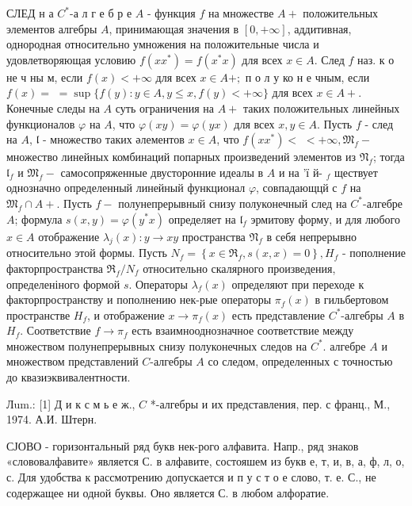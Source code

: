 \documentclass[10pt]{article}
\begin{document}
СЛЕД н а $C^{*}$-а л г е б р е $A$ - функция $f$ на множестве $A+$ положительных элементов алгебры $A$, принимающая значения в $[0,+\infty]$, аддитивная, однородная относительно умножения на положительные числа и удовлетворяющая условию $f\left(x x^{*}\right)=f\left(x^{*} x\right)$ для всех $x \in A$. След $f$ наз. к о не ч ны м, если $f(x)<+\infty$ для всех $x \in A+;$ п о л у ко н е чным, если $f(x)=$ $=\sup \{f(y): y \in A, y \leqslant x, f(y)<+\infty\}$ для всех $x \in A+$. Конечные следы на $A$ суть ограничения на $A+$ таких положительных линейных функционалов $\varphi$ на $A$, что $\varphi(x y)=\varphi(y x)$ для всех $x, y \in A$. Пусть $f$ - след на $A$, $\mathfrak{l}$ - множество таких әлементов $x \in A$, что $f\left(x x^{*}\right)<$ $<+\infty, \mathfrak{M}_{f}-$ множество линейных комбинаций попарных произведений элементов из $\mathfrak{N}_{f}$; тогда $\mathfrak{l}_{f}$ и $\mathfrak{M}_{f}-$ самосопряженные двусторонние идеалы в $A$ и на 'ї й- $_{f}$ ществует однозначно определенный линейный функционал $\varphi$, совпадающцй с $f$ на $\mathfrak{M}_{f} \cap A+$. Пусть $f-$ полунепрерывный снизу полуконечный след на $C^{*}$-алгебре $A$; формула $s(x, y)=\varphi\left(y^{*} x\right)$ определяет на $\mathfrak{l}_{f}$ эрмитову форму, и для любого $x \in A$ отображение $\lambda_{j}(x): y \rightarrow x y$ пространства $\mathfrak{N}_{f}$ в себя непрерывно относительно этой формы. Пусть $N_{f}=\left\{x \in \Re_{f}, s(x, x)=0\right\}, H_{f}$ - пополнение факторпространства $\mathfrak{R}_{f} / N_{f}$ относительно скалярного произведения, определеніного формой $s$. Операторы $\lambda_{f}(x)$ определяют при переходе к факторпространству и пополнению нек-рые операторы $\pi_{f}(x)$ в гильбертовом пространстве $H_{f}$, и отображение $x \rightarrow \pi_{f}(x)$ есть представление $C^{*}$-алгебры $A$ в $H_{f}$. Соответствие $f \rightarrow \pi_{f}$ есть взаимнооднозначное соответствие между множеством полунепрерывных снизу полуконечных следов на $C^{*}$. алгебре $A$ и множеством представлений $C$-алгебры $A$ со следом, определенных с точностью до квазиэквивалентности.



Лum.: [1] Д и к с м ь е ж., $C$ *-алгебры и их представления, пер. с франц., М., 1974. А.И. Штерн.



СЈОВО - горизонтальный ряд букв нек-рого алфавита. Напр., ряд знаков «слововалфавите» является С. в алфавите, состояшем из букв е, т, и, в, а, ф, л, о, с. Для удобства к рассмотрению допускается и п у с т о е слово, т. е. С., не содержащее ни одной буквы. Оно является С. в любом алфоратие.
\end{document}
